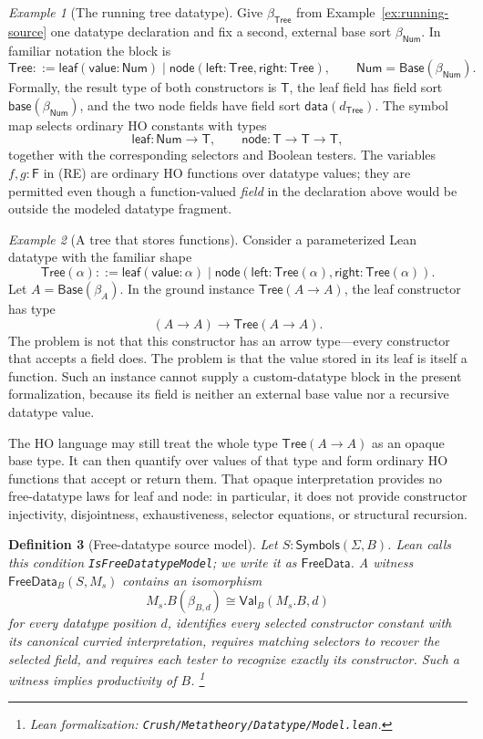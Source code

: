 \documentclass[11pt]{article}
\newtheorem{definition}{Definition}[section]
\theoremstyle{remark}
\newtheorem{example}[definition]{Example}
\newcommand{\leanfile}[1]{\footnote{Lean formalization: \texttt{Crush/Metatheory/#1}.}}
\newcommand{\Base}{\mathsf{Base}}
\newcommand{\FreeDataModel}{\mathsf{FreeData}}
\newcommand{\Val}{\mathsf{Val}}
\newcommand{\dsort}[2]{\beta_{#1,#2}}
\newcommand{\Tree}{\mathsf{Tree}}
\newcommand{\Num}{\mathsf{Num}}
\newcommand{\TreeTy}{\mathsf{T}}
\newcommand{\TreeFun}{\mathsf{F}}
\begin{document}
\begin{example}[The running tree datatype]
Give $\beta_{\Tree}$ from Example~\ref{ex:running-source} one datatype
declaration and fix a second, external base sort $\beta_{\Num}$. In familiar
notation the block is
\[
 \Tree ::= \mathsf{leaf}(\mathsf{value}:\Num)
       \mid \mathsf{node}(\mathsf{left}:\Tree,
                          \mathsf{right}:\Tree),
 \qquad
 \Num=\Base(\beta_{\Num}).
\]
Formally, the result type of both constructors is $\TreeTy$, the leaf field has
field sort $\mathsf{base}(\beta_{\Num})$, and the two node fields have field
sort $\mathsf{data}(d_{\Tree})$. The symbol map selects ordinary HO constants with
types
\[
 \mathsf{leaf}:\Num\to\TreeTy,
 \qquad
 \mathsf{node}:\TreeTy\to\TreeTy\to\TreeTy,
\]
together with the corresponding selectors and Boolean testers. The variables
$f,g:\TreeFun$ in (RE) are ordinary HO functions over datatype values; they
are permitted even though a function-valued \emph{field} in the declaration
above would be outside the modeled datatype fragment.
\end{example}

\begin{example}[A tree that stores functions]
Consider a parameterized Lean datatype with the familiar shape
\[
 \Tree(\alpha) ::= \mathsf{leaf}(\mathsf{value}:\alpha)
      \mid \mathsf{node}(\mathsf{left}:\Tree(\alpha),
                         \mathsf{right}:\Tree(\alpha)).
\]
Let $A=\Base(\beta_A)$. In the ground instance $\Tree(A\to A)$, the leaf
constructor has type
\[
 (A\to A)\to\Tree(A\to A).
\]
The problem is not that this constructor has an arrow type---every constructor
that accepts a field does. The problem is that the value stored in its leaf is
itself a function. Such an instance cannot supply a custom-datatype block in
the present formalization, because its field is neither an external base value
nor a recursive datatype value.

The HO language may still treat the whole type $\Tree(A\to A)$ as an opaque
base type. It can then quantify over values of that type and form ordinary HO
functions that accept or return them. That opaque interpretation provides no
free-datatype laws for \textsf{leaf} and \textsf{node}: in particular, it does
not provide constructor injectivity, disjointness, exhaustiveness, selector
equations, or structural recursion.
\end{example}

\begin{definition}[Free-datatype source model]
Let $S:\mathsf{Symbols}(\Sigma,B)$. Lean calls this condition
\texttt{IsFreeDatatypeModel}; we write it as $\FreeDataModel$. A witness
$\FreeDataModel_B(S,M_s)$ contains an isomorphism
\[
 M_s.B(\dsort{B}{d})\cong\Val_B(M_s.B,d)
\]
for every datatype position $d$, identifies every selected constructor constant
with its canonical curried interpretation, requires matching selectors to recover the
selected field, and requires each tester to recognize exactly its constructor.
Such a witness implies productivity of $B$.
\leanfile{Datatype/Model.lean}
\end{definition}
\end{document}
